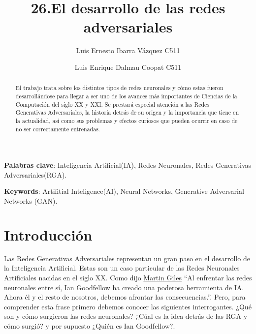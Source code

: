 \documentclass[a4paper]{article}
\begin{document}
\title{26.El desarrollo de las redes adversariales}
\author{Luis Ernesto Ibarra Vázquez C511\and
Luis Enrique Dalmau Coopat C511}
%
%
\renewcommand{\refname}{Bibliografía} 

\maketitle

\begin{abstract}

El trabajo trata sobre los distintos tipos de redes neuronales y cómo estas fueron desarrollándose
para llegar a ser uno de los avances más importantes de Ciencias de la Computación del siglo XX y XXI.
Se prestará especial atención a las Redes Generativas Adversariales, la historia detrás de su origen y
la importancia que tiene en la actualidad, así como sus problemas y efectos curiosos que pueden ocurrir
en caso de no ser correctamente entrenadas. 

\end{abstract}

\textbf{Palabras clave}: Inteligencia Artificial(IA), Redes Neuronales, Redes Generativas Adversariales(RGA).

\textbf{Keywords}: Artifitial Inteligence(AI), Neural Networks, Generative Adversarial Networks (GAN).

\section{Introducción}

Las Redes Generativas Adversariales representan un gran paso en el desarrollo de la Inteligencia
Artificial. Estas son un caso particular de las Redes Neuronales Artificiales nacidas en el siglo XX.
Como dijo \href{https://www.technologyreview.com/author/martin-giles/}{Martin Giles} 
``Al enfrentar las redes neuronales entre sí, Ian Goodfellow ha creado una poderosa herramienta 
de IA. Ahora él y el resto de nosotros, debemos afrontar las consecuencias.''. Pero, para comprender 
esta frase primero debemos conocer las siguientes interrogantes. ¿Qué son y cómo surgieron las redes neuronales? 
¿Cúal es la idea detrás de las RGA y cómo surgió? y por supuesto ¿Quién es Ian Goodfellow?.
\end{document}
